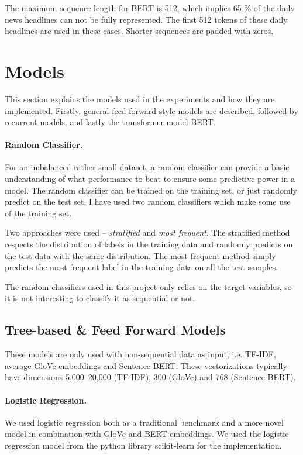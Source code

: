 The maximum sequence length for BERT is 512, which implies 65 \% of the daily news headlines can not be fully represented. The first 512 tokens of these daily headlines are used in these cases. Shorter sequences are padded with zeros.  

\section{Models}

This section explains the models used in the experiments and how they are implemented.  Firstly, general feed forward-style models are described, followed by recurrent models, and lastly the transformer model BERT.  

\paragraph{Random Classifier.}
For an imbalanced rather small dataset, a random classifier can provide a basic understanding of what performance to beat to ensure some predictive power in a model. The random classifier can be trained on the training set, or just randomly predict on the test set. I have used two random classifiers which make some use of the training set. 

Two approaches were used -- \emph{stratified} and \emph{most frequent}. The stratified method respects the distribution of labels in the training data and randomly predicts on the test data with the same distribution. The most frequent-method simply predicts the most frequent label in the training data on all the test samples.

The random classifiers used in this project only relies on the target variables, so it is not interesting to classify it as sequential or not.  

\subsection{Tree-based \& Feed Forward Models}

These models are only used with non-sequential data as input, i.e. TF-IDF, average GloVe embeddings and Sentence-BERT. These vectorizations typically have dimensions 5,000--20,000 (TF-IDF), 300 (GloVe) and 768 (Sentence-BERT). 


\paragraph{Logistic Regression.}
We used logistic regression both as a traditional benchmark and a more novel model in combination with GloVe and BERT embeddings. We used the logistic regression model from the python library scikit-learn  for the implementation.

